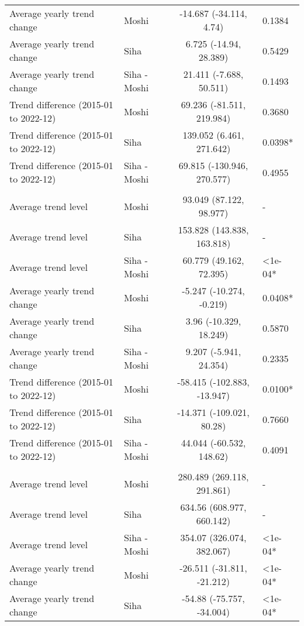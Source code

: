 \begin{longtable}{l|lcl}
Average yearly trend change & Moshi & -14.687 (-34.114, 4.74) & 0.1384 \\ 
Average yearly trend change & Siha & 6.725 (-14.94, 28.389) & 0.5429 \\ 
Average yearly trend change & Siha - Moshi & 21.411 (-7.688, 50.511) & 0.1493 \\ 
Trend difference (2015-01 to 2022-12) & Moshi & 69.236 (-81.511, 219.984) & 0.3680 \\ 
Trend difference (2015-01 to 2022-12) & Siha & 139.052 (6.461, 271.642) & 0.0398* \\ 
Trend difference (2015-01 to 2022-12) & Siha - Moshi & 69.815 (-130.946, 270.577) & 0.4955 \\ 
\midrule\addlinespace[2.5pt]
\multicolumn{4}{l}{Infectious Eye Disease} \\[2.5pt] 
\midrule\addlinespace[2.5pt]
Average trend level & Moshi & 93.049 (87.122, 98.977) & - \\ 
Average trend level & Siha & 153.828 (143.838, 163.818) & - \\ 
Average trend level & Siha - Moshi & 60.779 (49.162, 72.395) & <1e-04* \\ 
Average yearly trend change & Moshi & -5.247 (-10.274, -0.219) & 0.0408* \\ 
Average yearly trend change & Siha & 3.96 (-10.329, 18.249) & 0.5870 \\ 
Average yearly trend change & Siha - Moshi & 9.207 (-5.941, 24.354) & 0.2335 \\ 
Trend difference (2015-01 to 2022-12) & Moshi & -58.415 (-102.883, -13.947) & 0.0100* \\ 
Trend difference (2015-01 to 2022-12) & Siha & -14.371 (-109.021, 80.28) & 0.7660 \\ 
Trend difference (2015-01 to 2022-12) & Siha - Moshi & 44.044 (-60.532, 148.62) & 0.4091 \\ 
\midrule\addlinespace[2.5pt]
\multicolumn{4}{l}{Intestinal Worms} \\[2.5pt] 
\midrule\addlinespace[2.5pt]
Average trend level & Moshi & 280.489 (269.118, 291.861) & - \\ 
Average trend level & Siha & 634.56 (608.977, 660.142) & - \\ 
Average trend level & Siha - Moshi & 354.07 (326.074, 382.067) & <1e-04* \\ 
Average yearly trend change & Moshi & -26.511 (-31.811, -21.212) & <1e-04* \\ 
Average yearly trend change & Siha & -54.88 (-75.757, -34.004) & <1e-04* \\ 

\end{longtable}
